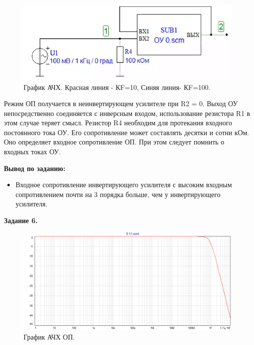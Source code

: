 \documentclass[a4paper,14pt]{extarticle}
\begin{document}
    \begin{figure}[h!]
        \begin{center}
            \includegraphics[scale=0.5]{14.png}
        \end{center}
        \vspace{-0.7cm}
        \caption{График АЧХ. Красная линия - КF=10, Синяя линия- КF=100.}
    \end{figure}

    Режим ОП получается в неинвертирующем усилителе при R2 = 0. Выход ОУ 
    непосредственно соединяется с инверсным входом, использование резистора 
    R1 в этом случае теряет смысл. Резистор R4 необходим для протекания 
    входного постоянного тока ОУ. Его сопротивление может составлять 
    десятки и сотни кОм. Оно определяет входное сопротивление ОП. При этом 
    следует помнить о входных токах ОУ.

    \textbf{Вывод по заданию:}

    \begin{itemize}
        \item Входное сопротивление инвертирующего усилителя с высоким входным сопротивлением почти на 3 порядка больше, чем у инвертирующего усилителя.
    \end{itemize}

    \newpage

    \begin{center}
        \textbf{Задание 6.}
    \end{center}
    \vspace{-0,5cm}
    \begin{figure}[h!]
        \begin{center}
            \includegraphics[scale=0.5]{15.png}
        \end{center}
        \vspace{-0.7cm}
        \caption{График АЧХ ОП.}
    \end{figure}
\end{document}
